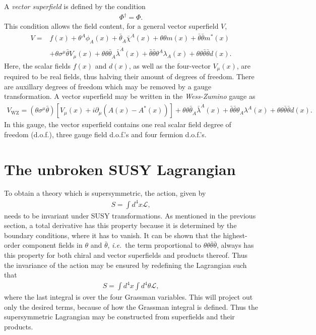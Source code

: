 \documentclass[twoside,english]{uiofysmaster}
\begin{document}
A {\it vector superfield} is defined by the condition
\begin{align}
	\Phi^\dag = \Phi.
\end{align}
This condition allows the field content, for a general vector superfield $V$,
\begin{align}
	V = &f(x) + \theta^A\phi_A(x) + \bar\theta_{\dot A}\bar\chi^{\dot A}(x) + \theta \theta m(x) + \bar\theta \bar\theta m^*(x)\\
	 &+ \theta\sigma^\mu \bar\theta V_\mu(x) + \theta\theta\bar\theta_{\dot A}\bar\lambda^{\dot A}(x) + \bar\theta \bar\theta \theta^A \lambda_A(x) + \theta \theta \bar\theta \bar\theta d(x).
\end{align}
Here, the scalar fields $f(x)$ and $d(x)$, as well as the four-vector $V_\mu (x)$, are required to be real fields, thus halving their amount of degrees of freedom. There are auxillary degrees of freedom which may be removed by a gauge transformation. A vector superfield may be written in the {\it Wess-Zumino} gauge as
\begin{align}
	V_\mathrm{WZ} = (\theta \sigma^\mu \bar\theta) \left[ V_\mu(x) + i\partial_\mu (A(x) - A^*(x)) \right] + \theta\theta \bar\theta_{\dot A} \bar\lambda^{\dot A}(x) + \bar\theta \bar\theta \theta_A \lambda^A(x) + \theta\theta \bar\theta \bar\theta d(x).
\end{align}
In this gauge, the vector superfield contains one real scalar field degree of freedom (d.o.f.), three gauge field d.o.f.'s and four fermion d.o.f.'s.

\section{The unbroken SUSY Lagrangian}
To obtain a theory which is supersymmetric, the action, given by
\begin{align}
 	S = \int d^4 x \mathcal{L},
 \end{align}
 needs to be invariant under SUSY transformations. As mentioned in the previous section, a total derivative has this property because it is determined by the boundary conditions, where it has to vanish. It can be shown that the highest-order component fields in $\theta$ and $\bar \theta$, {\it i.e.}\ the term proportional to $\theta\theta\bar\theta\bar\theta$, always has this property for both chiral and vector superfields and products thereof. Thus the invariance of the action may be ensured by redefining the Lagrangian such that
 \begin{align}
 	S = \int d^4 x \int d^4 \theta \mathcal{L},
 \end{align}
 where the last integral is over the four Grassman variables. This will project out only the desired terms, because of how the Grassman integral is defined. Thus the supersymmetric Lagrangian may be constructed from superfields and their products.
\end{document}
